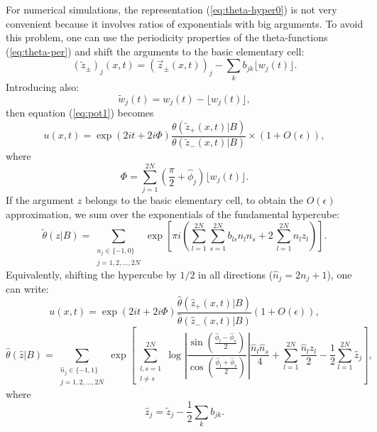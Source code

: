 \documentclass[12pt]{article}
\begin{document}
For numerical simulations, the representation  (\ref{eq:theta-hyper0}) is not very convenient because it involves ratios of exponentials with big arguments. To avoid this problem, one can use the periodicity properties of the theta-functions (\ref{eq:theta-per}) and shift the arguments to the basic elementary cell:
$$
(\tilde z_{\pm})_j(x,t) = (\vec{z}_{\pm}(x,t))_j - \sum\limits_k b_{jk} \lfloor w_j(t) \rfloor.
$$
Introducing also:
$$
\tilde w_j(t) = w_j(t) - \lfloor w_j(t) \rfloor,
$$
then equation (\ref{eq:pot1}) becomes 
\begin{equation}
\label{eq:pot11}
u(x,t)=\exp\left(2it + 2 i \Phi  \right)  
\frac{\theta(\tilde z_{+}(x,t)|B)}
{\theta(\tilde z_{-}(x,t)|B)}\times(1+O(\epsilon)),
\end{equation}
where
$$
\Phi = \sum\limits_{j=1}^{2N}  (\frac{\pi}{2} + \hat\phi_j)  \lfloor w_j(t) \rfloor .
$$
If the argument $z$ belongs to the basic elementary cell, to obtain the $O(\epsilon)$ approximation, we sum over the exponentials of the fundamental hypercube:
\begin{equation}
\label{eq:theta-hyper1}
\tilde\theta(z|B)= \sum\limits_{\begin{array}{c}n_j\in\{-1,0\}\\ j=1,2,\ldots,2N\end{array}}
\exp{\left[ \pi i \left(\sum\limits_{l=1}^{2N} \sum\limits_{s=1}^{2N} b_{ls}n_ln_s +  2\, \sum\limits_{l=1}^{2N}  n_l z_l \right) \right]}.
\end{equation}
Equivalently, shifting the hypercube by $1/2$ in all directions ($\hat n_j =2n_j+1$), one can write:
$$
u(x,t)=\exp\left(2it + 2 i \Phi  \right) \frac{\hat\theta(\hat z_{+}(x,t)|B)}
{\hat\theta(\hat z_{-}(x,t)|B)}  (1+O(\epsilon)),
$$
\begin{equation}
\label{eq:theta-hyper2}
\hat\theta(\hat z|B) = \sum\limits_{\begin{array}{c}{\hat n_j\in\{-1,1\}} \\ j=1,2,\ldots,2N\end{array}}
\exp{\left[ \sum\limits_{\begin{array}{c}l,s=1\\ l\ne s\end{array}}^{2N}\log \left|\frac{\sin\left(\frac{\hat\phi_l-\hat\phi_s}{2} \right)}{\cos\left(\frac{\hat\phi_l+\hat\phi_s}{2} \right) }\right| \frac{\hat n_l\hat n_s}{4} + \sum\limits_{l=1}^{2N}  \frac{\hat n_l \hat z_l}{2} - \frac{1}{2} \sum\limits_{l=1}^{2N} \hat z_j \right]},
\end{equation}
where
$$
\hat z_j = \tilde z_j -\frac{1}{2} \sum\limits_k b_{jk}.
$$
\end{document}
